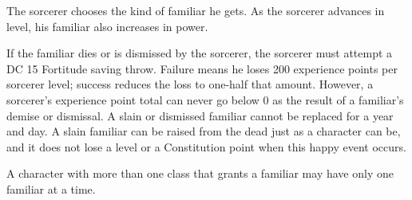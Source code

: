 The sorcerer chooses the kind of familiar he gets. As the sorcerer advances in 
level, his familiar also increases in power.

If the familiar dies or is dismissed by the sorcerer, the sorcerer must attempt 
a DC 15 Fortitude saving throw. Failure means he loses 200 experience points per 
sorcerer level; success reduces the loss to one-half that amount. However, a sorcerer's 
experience point total can never go below 0 as the result of a familiar's demise 
or dismissal. A slain or dismissed familiar cannot be replaced for a year and day. 
A slain familiar can be raised from the dead just as a character can be, and it 
does not lose a level or a Constitution point when this happy event occurs.

A character with more than one class that grants a familiar may have only one familiar 
at a time.
